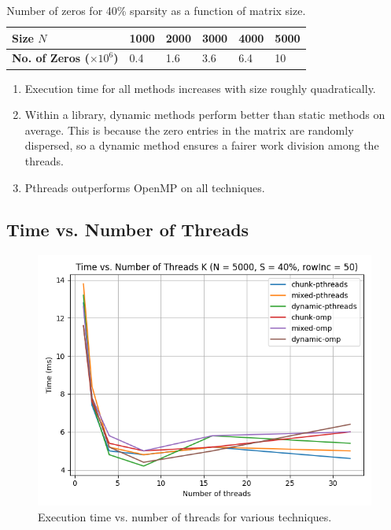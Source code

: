 \documentclass[conference,compsoc]{IEEEtran}
\begin{document}
\begin{table}[!ht]
    \begin{tabularx}{\columnwidth}{|Y|Y|Y|Y|Y|Y|}
        \hline
        \textbf{Size \(N\)} & 1000 & 2000 & 3000 & 4000 & 5000 \\
        \hline
        \textbf{No. of Zeros (\(\times 10^6\))} & 0.4 & 1.6 & 3.6 & 6.4 & 10 \\
        \hline
    \end{tabularx}
    \caption{Number of zeros for 40\% sparsity as a function of matrix size.}
    \label{tab:exp1-table}
\end{table}

\begin{enumerate}
    \item Execution time for all methods increases with size roughly
    quadratically.
    \item Within a library, dynamic methods perform better than static methods
    on average. This is because the zero entries in the matrix are randomly
    dispersed, so a dynamic method ensures a fairer work division among the
    threads.
    \item Pthreads outperforms OpenMP on all techniques.
\end{enumerate}

\subsection{Time vs. Number of Threads}
\label{subsec:exp2}

\begin{figure}[!ht]
    \includegraphics[width=\columnwidth]{images/exp2.png}
    \caption{Execution time vs. number of threads for various techniques.}
    \label{fig:exp-2}
\end{figure}
\end{document}

